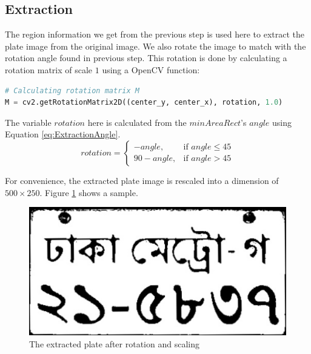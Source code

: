 \documentclass{standalone}
\begin{document}
\subsection{Extraction}
The region information we get from the previous step is used here to extract the plate image from the original image. We also rotate the image to match with the rotation angle found in previous step. This rotation is done by calculating a rotation matrix of scale $1$ using a OpenCV function:
\begin{lstlisting}[language=Python]
# Calculating rotation matrix M
M = cv2.getRotationMatrix2D((center_y, center_x), rotation, 1.0)
\end{lstlisting}

The variable $rotation$ here is calculated from the $minAreaRect$'s $angle$ using Equation \ref{eq:ExtractionAngle}.
\begin{equation} \label{eq:ExtractionAngle}
rotation = 
\begin{cases} 
	-angle, & \mbox{if } angle \leq 45\\
    90 - angle, & \mbox{if } angle > 45
\end{cases}
\end{equation}

For convenience, the extracted plate image is rescaled into a dimension of $500 \times 250$. Figure \ref{fig:FinalPlate} shows a sample.
\begin{figure}
    \centering
    \includegraphics[width=.7\linewidth]{./img/sample/stage10.jpg}
    \caption{The extracted plate after rotation and scaling}
    \label{fig:FinalPlate}
\end{figure}
\end{document}
